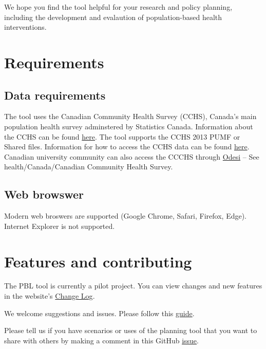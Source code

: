 \documentclass[]{book}
\begin{document}
We hope you find the tool helpful for your research and policy planning, including the development and evalaution of population-based health interventions.

\hypertarget{requirements}{%
\section{Requirements}\label{requirements}}

\hypertarget{data-requirements}{%
\subsection{Data requirements}\label{data-requirements}}

The tool uses the Canadian Community Health Survey (CCHS), Canada's main population health survey adminstered by Statistics Canada. Information about the CCHS can be found \href{http://www23.statcan.gc.ca/imdb/p2SV.pl?Function=getSurvey\&SDDS=3226}{here}. The tool supports the CCHS 2013 PUMF or Shared files. Information for how to access the CCHS data can be found \href{https://www150.statcan.gc.ca/n1/pub/82-620-m/2005001/4144189-eng.htm}{here}. Canadian university community can also access the CCCHS through \href{http://odesi2.scholarsportal.info/webview/}{Odesi} -- See health/Canada/Canadian Community Health Survey.

\hypertarget{web-browswer}{%
\subsection{Web browswer}\label{web-browswer}}

Modern web broswers are supported (Google Chrome, Safari, Firefox, Edge). Internet Explorer is not supported.

\hypertarget{features-and-contributing}{%
\section{Features and contributing}\label{features-and-contributing}}

The PBL tool is currently a pilot project. You can view changes and new features in the website's \href{http://http://planning.projectbiglife.ca/}{Change Log}.

We welcome suggestions and issues. Please follow this \href{https://github.com/Big-Life-Lab/PBL-Planning-Tool-Guidance/blob/master/contributing/CONTRIBUTING.md}{guide}.

Please tell us if you have scenarios or uses of the planning tool that you want to share with others by making a comment in this GitHub \href{https://github.com/Big-Life-Lab/PBL-Planning-Tool-Guidance/issues/9}{issue}.
\end{document}
